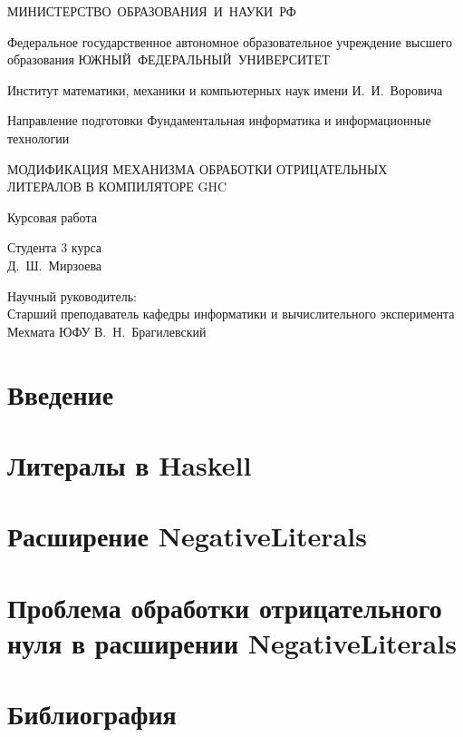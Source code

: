 \documentclass [fontsize=14pt, paper=a4, pagesize, DIV=calc]%
{scrreprt}
\begin{document}
\begin{titlepage}

\centering
\large

\vfill

МИНИСТЕРСТВО~ОБРАЗОВАНИЯ~И~НАУКИ~РФ

\vfill

Федеральное государственное автономное образовательное учреждение высшего
образования ЮЖНЫЙ~ФЕДЕРАЛЬНЫЙ~УНИВЕРСИТЕТ

\vfill

Институт математики, механики и компьютерных наук имени И.~И.~Воровича

\vfill

Направление подготовки Фундаментальная информатика и информационные технологии

\vfill

МОДИФИКАЦИЯ МЕХАНИЗМА ОБРАБОТКИ ОТРИЦАТЕЛЬНЫХ ЛИТЕРАЛОВ В КОМПИЛЯТОРЕ GHC

\vfill

Курсовая работа

\raggedleft

\vfill

Студента 3 курса\\
Д.~Ш.~Мирзоева

\vfill

Научный руководитель:\\
Старший преподаватель кафедры информатики и вычислительного эксперимента
Мехмата ЮФУ В.~Н.~Брагилевский

\end{titlepage}


\tableofcontents


\chapter*{Введение}


\chapter{Литералы в Haskell}


\chapter{Расширение NegativeLiterals}


\chapter[Проблема в расширении NegativeLiterals]
{Проблема обработки отрицательного нуля в расширении NegativeLiterals}


\chapter{Библиография}
\end{document}
